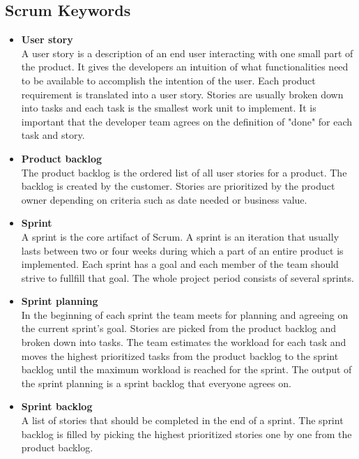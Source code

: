 \subsection{Scrum Keywords}
\begin{itemize}
\item{\textbf{User story}}\\
A user story is a description of an end user interacting with one small part
of the product. It gives the developers an intuition of what functionalities need to be available
to accomplish the intention of the user.
Each product requirement is translated into a user story. Stories are usually
broken down into tasks and each task is the smallest work unit to implement.
It is important that the developer team agrees on the definition of "done" for each task and story.

\item{\textbf{Product backlog}}\\
The product backlog is the ordered list of all user stories for a product. The backlog
is created by the customer.
Stories are prioritized by the product owner depending on criteria such as date needed or business value.

\item{\textbf{Sprint}}\\
A sprint is the core artifact of Scrum. A sprint is an iteration that usually lasts between two or four weeks
during which a part of an entire product is implemented. Each sprint has a goal and each member of
the team should strive to fullfill that goal. The whole project period consists of several sprints.

\item{\textbf{Sprint planning}}\\
In the beginning of each sprint the team meets for planning and agreeing on the current sprint's goal.
Stories are picked from the product backlog and broken down into tasks. The team estimates the workload
for each task and moves the highest prioritized tasks from the product backlog to the
sprint backlog until the maximum workload is reached for the sprint. The output of the sprint planning
is a sprint backlog that everyone agrees on. 

\item{\textbf{Sprint backlog}}\\
A list of stories that should be completed in the end of a sprint. The sprint backlog is filled by picking the highest 
prioritized stories one by one from the product backlog. 


\end{itemize}
